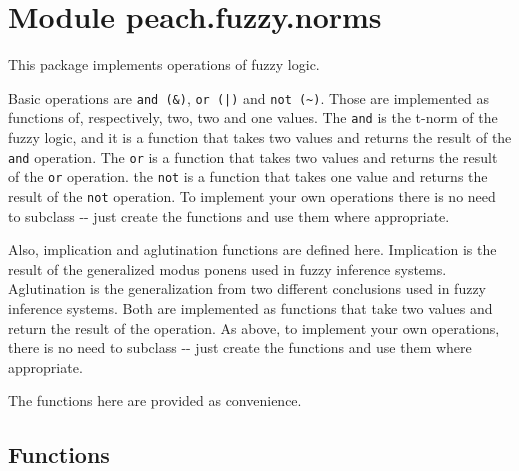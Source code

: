 %
%
%


\section{Module peach.fuzzy.norms}

    \label{peach:fuzzy:norms}

This package implements operations of fuzzy logic.

Basic operations are \texttt{and ({\&})}, \texttt{or (|)} and \texttt{not ({\textasciitilde})}. Those are
implemented as functions of, respectively, two, two and one values. The \texttt{and}
is the t-norm of the fuzzy logic, and it is a function that takes two values and
returns the result of the \texttt{and} operation. The \texttt{or} is a function that takes
two values and returns the result of the \texttt{or} operation. the \texttt{not} is a
function that takes one value and returns the result of the \texttt{not} operation.
To implement your own operations there is no need to subclass -{}- just create the
functions and use them where appropriate.

Also, implication and aglutination functions are defined here. Implication is
the result of the generalized modus ponens used in fuzzy inference systems.
Aglutination is the generalization from two different conclusions used in fuzzy
inference systems. Both are implemented as functions that take two values and
return the result of the operation. As above, to implement your own operations,
there is no need to subclass -{}- just create the functions and use them where
appropriate.

The functions here are provided as convenience.


  \subsection{Functions}


